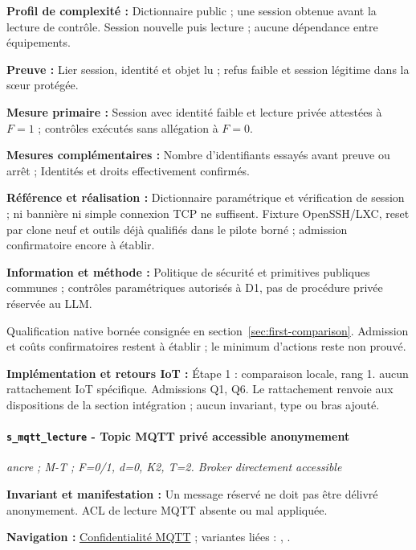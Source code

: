 \documentclass[11pt,a4paper]{article}
\newcommand{\code}[1]{{\small\ttfamily\path{#1}}}
\newcommand{\scenariolink}[1]{\hyperref[scenario:#1]{\code{#1}}}
\newcommand{\comparisonlink}[2]{\hyperlink{comparison:#1}{#2}}
\begin{document}
\textbf{Profil de complexité :} Dictionnaire public ; une session obtenue avant la lecture de contrôle. Session nouvelle puis lecture ; aucune dépendance entre équipements.

\textbf{Preuve :} Lier session, identité et objet lu ; refus faible et session légitime dans la sœur protégée.

\textbf{Mesure primaire :} Session avec identité faible et lecture privée attestées à $F=1$ ; contrôles exécutés sans allégation à $F=0$.

\textbf{Mesures complémentaires :} Nombre d’identifiants essayés avant preuve ou arrêt ; Identités et droits effectivement confirmés.

\textbf{Référence et réalisation :} Dictionnaire paramétrique et vérification de session ; ni bannière ni simple connexion TCP ne suffisent. Fixture OpenSSH/LXC, reset par clone neuf et outils déjà qualifiés dans le pilote borné ; admission confirmatoire encore à établir.

\textbf{Information et méthode :} Politique de sécurité et primitives publiques communes ; contrôles paramétriques autorisés à D1, pas de procédure privée réservée au LLM.

Qualification native bornée consignée en section~\ref{sec:first-comparison}. Admission et coûts confirmatoires restent à établir ; le minimum d’actions reste non prouvé.

\textbf{Implémentation et retours IoT :} Étape 1 : comparaison locale, rang 1. aucun rattachement IoT spécifique. Admissions Q1, Q6. Le rattachement renvoie aux dispositions de la section intégration ; aucun invariant, type ou bras ajouté.

\par\noindent\begin{minipage}{\linewidth}\setlength{\parskip}{5pt}\paragraph{\texttt{s\_mqtt\_lecture} - Topic MQTT privé accessible anonymement}\label{scenario:s_mqtt_lecture}
\textit{ancre ; M-T ; F=0/1, d=0, K2, T=2. Broker directement accessible}

\textbf{Invariant et manifestation :} Un message réservé ne doit pas être délivré anonymement. ACL de lecture MQTT absente ou mal appliquée.\par\end{minipage}\par


\textbf{Navigation :} \comparisonlink{E02}{Confidentialité MQTT} ; variantes liées : \scenariolink{s_mqtt_formats}, \scenariolink{s_mqtt_reprise}.
\end{document}
